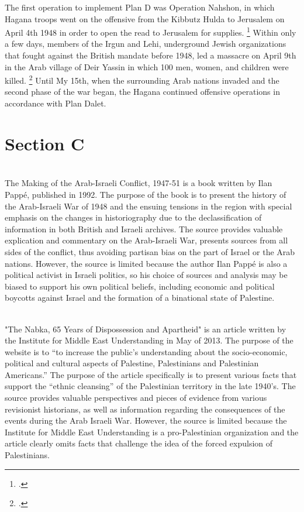 \documentclass{turabian-researchpaper}
\begin{document}
The first operation to implement Plan D was Operation Nahshon, in which Hagana troops went on the offensive from the Kibbutz Hulda to Jerusalem on April 4th 1948 in order to open the read to Jerusalem for supplies.
\footcite[][121]{morris}
Within only a few days, members of the Irgun and Lehi, underground Jewish organizations that fought against the British mandate before 1948, led a massacre on April 9th in the Arab village of Deir Yassin in which 100 men, women, and children were killed.
\footcite{nabka}
Until My 15th, when the surrounding Arab nations invaded and the second phase of the war began, the Hagana continued offensive operations in accordance with Plan Dalet.


\section{Section C}
 ~\\
The Making of the Arab-Israeli Conflict, 1947-51 is a book written by Ilan Pappé, published in 1992.  The purpose of the book is to present the history of the Arab-Israeli War of 1948 and the ensuing tensions in the region with special emphasis on the changes in historiography due to the declassification of information in both British and Israeli archives.  The source provides valuable explication and commentary on the Arab-Israeli War, presents sources from all sides of the conflict, thus avoiding partisan bias on the part of Israel or the Arab nations.  However, the source is limited because the author Ilan Pappé is also a political activist in Israeli politics, so his choice of sources and analysis may be biased to support his own political beliefs, including economic and political boycotts against Israel and the formation of a binational state of Palestine.


 ~\\
"The Nabka, 65 Years of Dispossession and Apartheid" is an article written by the Institute for Middle East Understanding in May of 2013.  The purpose of the website is to “to increase the public's understanding about the socio-economic, political and cultural aspects of Palestine, Palestinians and Palestinian Americans.”  The purpose of the article specifically is to present various facts that support the “ethnic cleansing” of the Palestinian territory in the late 1940's.  The source provides valuable perspectives and pieces of evidence from various revisionist historians, as well as information regarding the consequences of the events during the Arab Israeli War.  However, the source is limited because the Institute for Middle East Understanding is a pro-Palestinian organization and the article clearly omits facts that challenge the idea of the forced expulsion of Palestinians.
\end{document}
